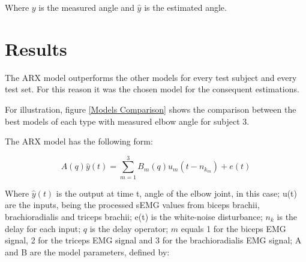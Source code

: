 \documentclass[letterpaper, 10 pt, conference]{ieeeconf}  %
\begin{document}

% 
% 

% 
% 

Where $y$ is the measured angle and $\hat{y}$ is the estimated angle.



\section{Results}

The ARX model outperforms the other models for every test subject and every test set.  For this reason it was the chosen model for the consequent estimations.

For illustration, figure \ref{Models Comparison} shows the comparison between the best models of each type with measured elbow angle for subject 3.

The ARX model has the following form:

\begin{equation}
\label{eq:ARX}
A(q)\hat{y}(t) = \sum_{m=1}^{3}B_m(q)u_m(t-n_{k_m})+e(t)
\end{equation}

Where \(\hat{y}(t)\) is the output at time t, angle of the elbow joint, in this case; u(t) are the inputs, being the processed sEMG values from biceps brachii, brachioradialis and triceps brachii; e(t) is the white-noise disturbance; \(n_k\)  is the delay for each input; \(q\) is the delay operator; \(m\) equals 1 for the biceps EMG signal, 2 for the triceps EMG signal and 3 for the brachioradialis EMG signal; A and B are the model parameters, defined by:
\end{document}
